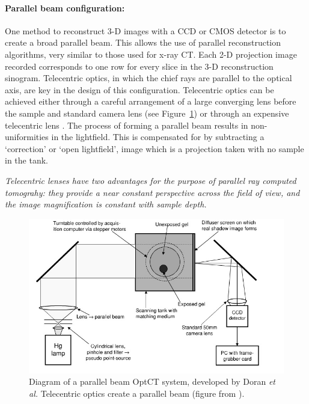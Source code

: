 \documentclass[12pt]{article}
\begin{document}
\paragraph{Parallel beam configuration:} One method to reconstruct 3-D images with a CCD or CMOS detector is to create a broad parallel beam. This allows the use of parallel reconstruction algorithms, very similar to those used for x-ray CT. Each 2-D projection image recorded corresponds to one row for every slice in the 3-D reconstruction sinogram. \cite{Doran:2008kh}
Telecentric optics, in which the chief rays are parallel to the optical axis, are key in the design of this configuration. \cite{Walls:2005ja} Telecentric optics can be achieved either through a careful arrangement  of  a large converging lens before the sample and standard camera lens  \cite{Doran:2001ee} (see Figure~\ref{fig:doran_ccd_setup}) or through an expensive telecentric lens \cite{Sakhalkar:2008exa}. The process of forming a parallel beam results in non-uniformities in the lightfield. This is compensated for by subtracting a `correction' or `open lightfield', image which is a projection taken with no sample in the tank. \cite{Doran:2001ee}

\textit{Telecentric lenses have two advantages for the purpose of parallel ray computed tomograhy: they provide a near constant perspective across the field of view, and the image magnification is constant with sample depth.} \cite{Oldham:2007ku}

\begin{figure}[H]
\centering
\includegraphics[scale=0.6]{Doran_2001_ccdsetup.jpg}
\caption{Diagram of a parallel beam  OptCT system, developed by Doran \textit{et al.} Telecentric optics create a parallel beam  (figure from \cite{Doran:2001ee}). }
\label{fig:doran_ccd_setup}
\end{figure}
\end{document}
